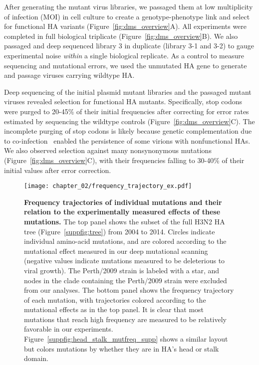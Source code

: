 After generating the mutant virus libraries, we passaged them at low multiplicity of infection (MOI) in cell culture to create a genotype-phenotype link and select for functional HA variants (Figure~\ref{fig:dms_overview}A).
All experiments were completed in full biological triplicate (Figure~\ref{fig:dms_overview}B).
We also passaged and deep sequenced library 3 in duplicate (library 3-1 and 3-2) to gauge experimental noise \textit{within} a single biological replicate.
As a control to measure sequencing and mutational errors, we used the unmutated HA gene to generate and passage viruses carrying wildtype HA.

Deep sequencing of the initial plasmid mutant libraries and the passaged mutant viruses revealed selection for functional HA mutants.
Specifically, stop codons were purged to 20-45\% of their initial frequencies after correcting for error rates estimated by sequencing the wildtype controls (Figure~\ref{fig:dms_overview}C).
The incomplete purging of stop codons is likely because genetic complementation due to co-infection~\citep{marshall2013influenza, brooke2013most} enabled the persistence of some virions with nonfunctional HAs.
We also observed selection against many nonsynonymous mutations (Figure~\ref{fig:dms_overview}C), with their frequencies falling to 30-40\% of their initial values after error correction.

\begin{figure}
  \centering
  \texttt{[image: chapter\_02/frequency\_trajectory\_ex.pdf]}
  \caption{\label{fig:frequency_trajectory}
    {\bf Frequency trajectories of individual mutations and their relation to the experimentally measured effects of these mutations.}
    The top panel shows the subset of the full H3N2 HA tree (Figure~\ref{suppfig:tree}) from 2004 to 2014.
    Circles indicate individual amino-acid mutations, and are colored according to the mutational effect measured in our deep mutational scanning (negative values indicate mutations measured to be deleterious to viral growth).
    The Perth/2009 strain is labeled with a star, and nodes in the clade containing the Perth/2009 strain were excluded from our analyses.
    The bottom panel shows the frequency trajectory of each mutation, with trajectories colored according to the mutational effects as in the top panel.
    It is clear that most mutations that reach high frequency are measured to be relatively favorable in our experiments.
    Figure~\ref{suppfig:head_stalk_mutfreq_supp} shows a similar layout but colors mutations by whether they are in HA's head or stalk domain.
}
\end{figure}

